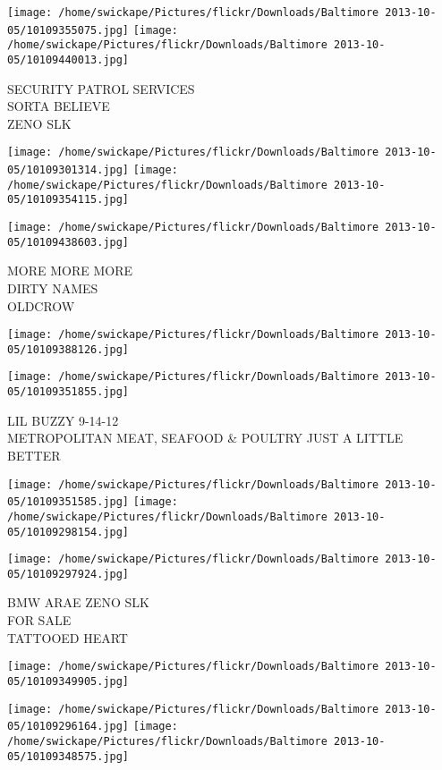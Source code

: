 \documentclass[10pt,letterpaper]{article}
\begin{document}
\vspace{0.25in}
\texttt{[image: /home/swickape/Pictures/flickr/Downloads/Baltimore 2013-10-05/10109355075.jpg]}
\texttt{[image: /home/swickape/Pictures/flickr/Downloads/Baltimore 2013-10-05/10109440013.jpg]}

SECURITY PATROL SERVICES\\
SORTA BELIEVE\\
ZENO SLK
\pagebreak

\texttt{[image: /home/swickape/Pictures/flickr/Downloads/Baltimore 2013-10-05/10109301314.jpg]}
\texttt{[image: /home/swickape/Pictures/flickr/Downloads/Baltimore 2013-10-05/10109354115.jpg]}

\texttt{[image: /home/swickape/Pictures/flickr/Downloads/Baltimore 2013-10-05/10109438603.jpg]}

MORE MORE MORE\\
DIRTY NAMES\\
OLDCROW
\pagebreak

\texttt{[image: /home/swickape/Pictures/flickr/Downloads/Baltimore 2013-10-05/10109388126.jpg]}

\vspace{0.25in}
\texttt{[image: /home/swickape/Pictures/flickr/Downloads/Baltimore 2013-10-05/10109351855.jpg]}

LIL BUZZY 9{-}14{-}12\\
METROPOLITAN MEAT, SEAFOOD \& POULTRY JUST A LITTLE BETTER
\pagebreak

\texttt{[image: /home/swickape/Pictures/flickr/Downloads/Baltimore 2013-10-05/10109351585.jpg]}
\texttt{[image: /home/swickape/Pictures/flickr/Downloads/Baltimore 2013-10-05/10109298154.jpg]}

\texttt{[image: /home/swickape/Pictures/flickr/Downloads/Baltimore 2013-10-05/10109297924.jpg]}

BMW ARAE ZENO SLK\\
FOR SALE\\
TATTOOED HEART
\pagebreak

\texttt{[image: /home/swickape/Pictures/flickr/Downloads/Baltimore 2013-10-05/10109349905.jpg]}

\vspace{0.25in}
\texttt{[image: /home/swickape/Pictures/flickr/Downloads/Baltimore 2013-10-05/10109296164.jpg]}
\texttt{[image: /home/swickape/Pictures/flickr/Downloads/Baltimore 2013-10-05/10109348575.jpg]}
\end{document}
